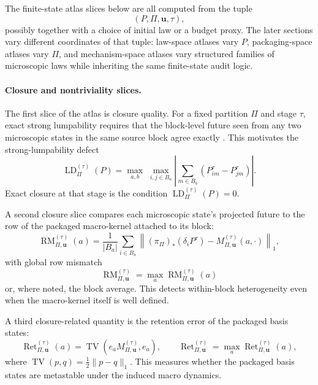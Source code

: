 \documentclass[11pt]{article}
\theoremstyle{definition}
\begin{document}
The finite-state atlas slices below are all computed from the tuple
\[
(P,\Pi,\mathbf{u},\tau),
\]
possibly together with a choice of initial law or a budget proxy. The later sections vary different coordinates of that tuple: law-space atlases vary $P$, packaging-space atlases vary $\Pi$, and mechanism-space atlases vary structured families of microscopic laws while inheriting the same finite-state audit logic.

\paragraph{Closure and nontriviality slices.}
The first slice of the atlas is closure quality. For a fixed partition $\Pi$ and stage $\tau$, exact strong lumpability requires that the block-level future seen from any two microscopic states in the same source block agree exactly \cite{kemeny1960finite,buchholz1994lumpability}. This motivates the strong-lumpability defect
\begin{equation}\label{eq:lumpability_defect}
\operatorname{LD}_{\Pi}^{(\tau)}(P)
=
\max_{a,b}
\;
\max_{i,j\in B_{a}}
\left|
\sum_{m\in B_{b}} (P^{\tau}_{im}-P^{\tau}_{jm})
\right|.
\end{equation}
Exact closure at that stage is the condition $\operatorname{LD}_{\Pi}^{(\tau)}(P)=0$.

A second closure slice compares each microscopic state's projected future to the row of the packaged macro-kernel attached to its block:
\begin{equation}\label{eq:row_mismatch}
\operatorname{RM}_{\Pi,\mathbf{u}}^{(\tau)}(a)
=
\frac{1}{|B_{a}|}
\sum_{i\in B_{a}}
\left\|
(\pi_{\Pi})_{*}(\delta_{i}P^{\tau})
-
M_{\Pi,\mathbf{u}}^{(\tau)}(a,\cdot)
\right\|_{1},
\end{equation}
with global row mismatch
\[
\operatorname{RM}_{\Pi,\mathbf{u}}^{(\tau)}
=
\max_{a}\operatorname{RM}_{\Pi,\mathbf{u}}^{(\tau)}(a)
\]
or, where noted, the block average. This detects within-block heterogeneity even when the macro-kernel itself is well defined.

A third closure-related quantity is the retention error of the packaged basis states:
\begin{equation}\label{eq:retention_error}
\operatorname{Ret}_{\Pi,\mathbf{u}}^{(\tau)}(a)
=
\operatorname{TV}\!\left(
e_{a}M_{\Pi,\mathbf{u}}^{(\tau)},
e_{a}
\right),
\qquad
\operatorname{Ret}_{\Pi,\mathbf{u}}^{(\tau)}
=
\max_{a}\operatorname{Ret}_{\Pi,\mathbf{u}}^{(\tau)}(a),
\end{equation}
where $\operatorname{TV}(p,q)=\frac12\|p-q\|_{1}$. This measures whether the packaged basis states are metastable under the induced macro dynamics.
\end{document}
